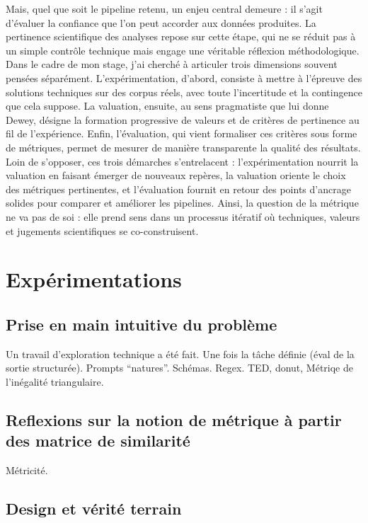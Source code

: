 Mais, quel que soit le pipeline retenu, un enjeu central demeure : il s’agit d’évaluer la confiance que l’on peut accorder aux données produites. La pertinence scientifique des analyses repose sur cette étape, qui ne se réduit pas à un simple contrôle technique mais engage une véritable réflexion méthodologique. Dans le cadre de mon stage, j’ai cherché à articuler trois dimensions souvent pensées séparément. L’expérimentation, d’abord, consiste à mettre à l’épreuve des solutions techniques sur des corpus réels, avec toute l’incertitude et la contingence que cela suppose. La valuation, ensuite, au sens pragmatiste que lui donne Dewey, désigne la formation progressive de valeurs et de critères de pertinence au fil de l’expérience. Enfin, l’évaluation, qui vient formaliser ces critères sous forme de métriques, permet de mesurer de manière transparente la qualité des résultats. Loin de s’opposer, ces trois démarches s’entrelacent : l’expérimentation nourrit la valuation en faisant émerger de nouveaux repères, la valuation oriente le choix des métriques pertinentes, et l’évaluation fournit en retour des points d’ancrage solides pour comparer et améliorer les pipelines. Ainsi, la question de la métrique ne va pas de soi : elle prend sens dans un processus itératif où techniques, valeurs et jugements scientifiques se co-construisent.

\chapter{Expérimentations}

\section{Prise en main intuitive du problème}

Un travail d'exploration technique a été fait. Une fois la tâche définie (éval de la sortie structurée). Prompts \enquote{natures}. Schémas. Regex.
TED, donut, Métriqe de l'inégalité triangulaire.

\section{Reflexions sur la notion de métrique à partir des matrice de similarité}

Métricité.

\section{Design et vérité terrain}

